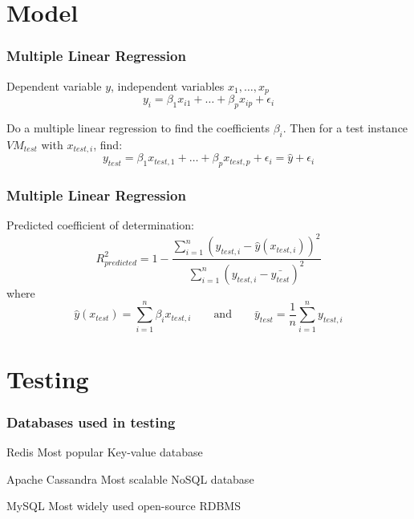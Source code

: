 \documentclass{beamer}
\begin{document}
\section{Model}
\begin{frame}
\frametitle{Multiple Linear Regression}
Dependent variable $y$, independent variables $x_1,\ldots,x_p$
\begin{displaymath}{
y_i = \beta_1 x_{i1}+\ldots+\beta_{p}x_{ip}+\epsilon_i
}\end{displaymath}

Do a multiple linear regression to find the coefficients $\beta_i$.  Then for a test instance $VM_{test}$ with $x_{test,i}$, find:
\begin{displaymath}{
y_{test} = \beta_1 x_{test,1}+\ldots+\beta_{p}x_{test,p}+\epsilon_i = \hat{y}+\epsilon_i 
}\end{displaymath}

\end{frame}

\begin{frame}
\frametitle{Multiple Linear Regression}
Predicted coefficient of determination:
\begin{displaymath}
R_{predicted}^2=1-\frac{\sum_{i=1}^{n} (y_{test,i} - \hat{y}(x_{test,i}))^{2}}{\sum_{i=1}^{n} (y_{test,i} - \bar{y_{test}})^{2}}
\end{displaymath}
where
\begin{displaymath}
\hat{y}(x_{test})=\sum_{i=1}^{n} \beta_i x_{test,i}
\qquad\text{and}\qquad
\bar{y}_{test}=\frac{1}{n}\sum_{i=1}^{n} y_{test,i}
\end{displaymath}
\end{frame}
\section{Testing}

\begin{frame}
\frametitle{Databases used in testing}
\begin{block}{Redis}
Most popular Key-value database
\end{block}
\begin{block}{Apache Cassandra}
Most scalable NoSQL database
\end{block}
\begin{block}{MySQL}
Most widely used open-source RDBMS
\end{block}
\end{frame}
\end{document}
